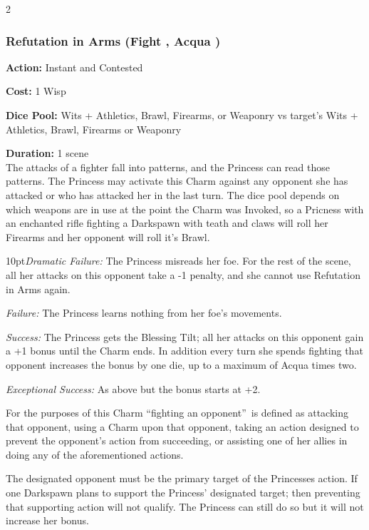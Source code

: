 \begin{multicols}{2}
\subsubsection*{Refutation in Arms (Fight \textbullet\textbullet\textbullet, Acqua \textbullet\textbullet)}

\noindent \textbf{Action:} Instant and Contested

\noindent \textbf{Cost:} 1 Wisp

\noindent \textbf{Dice Pool:} Wits + Athletics, Brawl, Firearms, or Weaponry vs target's Wits + Athletics, Brawl, Firearms or Weaponry

\noindent \textbf{Duration:} 1 scene\\

The attacks of a fighter fall into patterns, and the Princess can read those patterns. The Princess may activate this Charm against any opponent she has attacked or who has attacked her in the last turn. The dice pool depends on which weapons are in use at the point the Charm was Invoked, so a Pricness with an enchanted rifle fighting a Darkspawn with teath and claws will roll her Firearms and her opponent will roll it's Brawl. 

\begin{myindentpar}{10pt}\emph{Dramatic Failure:} The Princess misreads her foe. For the rest of the scene, all her attacks on this opponent take a -1 penalty, and she cannot use Refutation in Arms again.

\emph{Failure:} The Princess learns nothing from her foe's movements.

\emph{Success:} The Princess gets the Blessing Tilt; all her attacks on this opponent gain a +1 bonus until the Charm ends. In addition every turn she spends fighting that opponent increases the bonus by one die, up to a maximum of Acqua times two. 

\emph{Exceptional Success:} As above but the bonus starts at +2.\end{myindentpar}

\noindent For the purposes of this Charm \textquotedblleft fighting an opponent\textquotedblright\, is defined as attacking that opponent, using a Charm upon that opponent, taking an action designed to prevent the opponent's action from succeeding, or assisting one of her allies in doing any of the aforementioned actions.

The designated opponent must be the primary target of the Princesses action. If one Darkspawn plans to support the Princess' designated target; then preventing that supporting action will not qualify. The Princess can still do so but it will not increase her bonus. 


\end{multicols}
